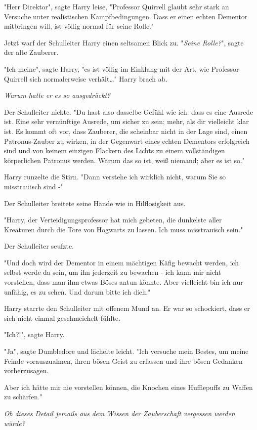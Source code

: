 {"Herr Direktor", sagte Harry leise, "Professor Quirrell glaubt sehr stark an Versuche unter realistischen Kampfbedingungen. Dass er einen echten Dementor mitbringen will, ist völlig normal für seine Rolle."

Jetzt warf der Schulleiter Harry einen seltsamen Blick zu. "\emph{Seine Rolle?}", sagte der alte Zauberer.

"Ich meine", sagte Harry, "es ist völlig im Einklang mit der Art, wie Professor Quirrell sich normalerweise verhält…" Harry brach ab.

\emph{Warum hatte er es so ausgedrückt?}

Der Schulleiter nickte. "Du hast also dasselbe Gefühl wie ich: dass es eine Ausrede ist. Eine sehr vernünftige Ausrede, um sicher zu sein; mehr, als dir vielleicht klar ist. Es kommt oft vor, dass Zauberer, die scheinbar nicht in der Lage sind, einen Patronus-Zauber zu wirken, in der Gegenwart eines echten Dementors erfolgreich sind und von keinem einzigen Flackern des Lichts zu einem vollständigen körperlichen Patronus werden. Warum das so ist, weiß niemand; aber es ist so."

Harry runzelte die Stirn. "Dann verstehe ich wirklich nicht, warum Sie so misstrauisch sind -"

Der Schulleiter breitete seine Hände wie in Hilflosigkeit aus.

"Harry, der Verteidigungsprofessor hat mich gebeten, die dunkelste aller Kreaturen durch die Tore von Hogwarts zu lassen. Ich muss misstrauisch sein."

Der Schulleiter seufzte.

"Und doch wird der Dementor in einem mächtigen Käfig bewacht werden, ich selbst werde da sein, um ihn jederzeit zu bewachen - ich kann mir nicht vorstellen, dass man ihm etwas Böses antun könnte. Aber vielleicht bin ich nur unfähig, es zu sehen. Und darum bitte ich dich."

Harry starrte den Schulleiter mit offenem Mund an. Er war so schockiert, dass er sich nicht einmal geschmeichelt fühlte.

"Ich?!", sagte Harry.

"Ja", sagte Dumbledore und lächelte leicht. "Ich versuche mein Bestes, um meine Feinde vorauszuahnen, ihren bösen Geist zu erfassen und ihre bösen Gedanken vorherzusagen.

Aber ich hätte mir nie vorstellen können, die Knochen eines Hufflepuffs zu Waffen zu schärfen."

\emph{Ob dieses Detail jemails aus dem Wissen der Zauberschaft vergessen werden würde?}

}

